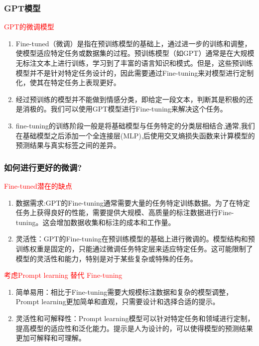\documentclass[t]{beamer}
\begin{document}
\begin{CJK*}{UTF8}{gkai}
\begin{frame}
	\frametitle{GPT模型}
	\textcolor{red}{GPT的微调模型}\\
	\begin{enumerate}
		\item Fine-tuned（微调）是指在预训练模型的基础上，通过进一步的训练和调整，使模型适应特定任务或数据集的过程。预训练模型（如GPT）通常是在大规模无标注文本上进行训练，学习到了丰富的语言知识和模式。但是，这些预训练模型并不是针对特定任务设计的，因此需要通过Fine-tuning来对模型进行定制化，使其在特定任务上表现更好。
		\item 经过预训练的模型并不能做到情感分类，即给定一段文本，判断其是积极的还是消极的。我们可以使用GPT模型进行Fine-tuning来解决这个任务。
		\item fine-tuning的训练阶段一般是将基础模型与任务特定的分类层相结合,通常,我们在基础模型之后添加一个全连接层(MLP),后使用交叉熵损失函数来计算模型的预测结果与真实标签之间的差异。
	\end{enumerate}
\end{frame}


\begin{frame}
	\frametitle{如何进行更好的微调?}
	\textcolor{red}{Fine-tuned潜在的缺点}\\
	\begin{enumerate}
		\item 数据需求:GPT的Fine-tuning通常需要大量的任务特定训练数据。为了在特定任务上获得良好的性能，需要提供大规模、高质量的标注数据进行Fine-tuning。这会增加数据收集和标注的成本和工作量。
		\item 灵活性：GPT的Fine-tuning在预训练模型的基础上进行微调的。模型结构和预训练权重是固定的，只能通过微调任务特定层来适应特定任务。这可能限制了模型的灵活性和能力，特别是对于某些复杂或特殊的任务。
	\end{enumerate}
	\textcolor{red}{考虑Prompt learning 替代 Fine-tuning}\\
	\begin{enumerate}
		\item 简单易用：相比于Fine-tuning需要大规模标注数据和复杂的模型调整，Prompt learning更加简单和直观，只需要设计和选择合适的提示。
		\item 灵活性和可解释性：Prompt learning模型可以针对特定任务和领域进行定制，提高模型的适应性和泛化能力。提示是人为设计的，可以使得模型的预测结果更加可解释和可理解。
	\end{enumerate}
\end{frame}



\end{CJK*}
\end{document}
